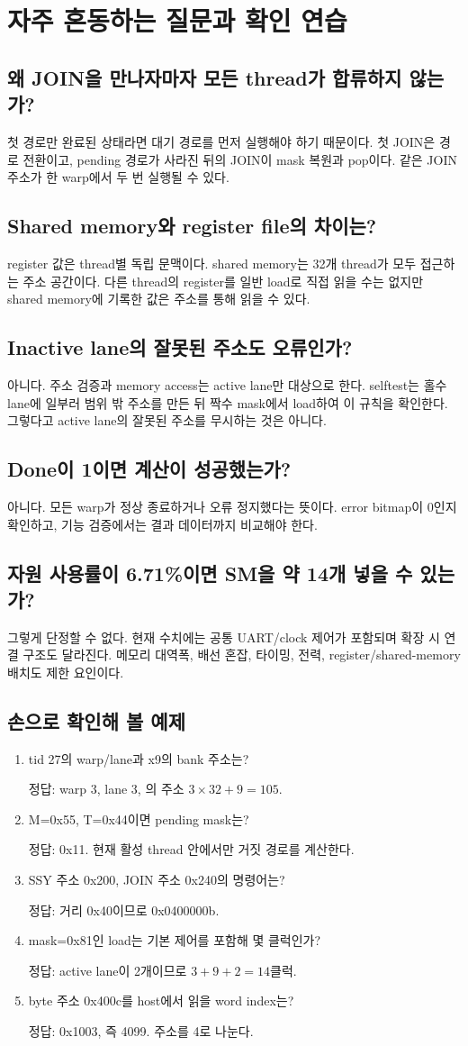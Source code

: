 \documentclass[a4paper,11pt]{article}
\newcommand{\code}[1]{\texttt{\detokenize{#1}}}
\newcommand{\chapterpage}[1]{\clearpage\section{#1}}
\begin{document}
\chapterpage{자주 혼동하는 질문과 확인 연습}
\subsection{왜 JOIN을 만나자마자 모든 thread가 합류하지 않는가?}
첫 경로만 완료된 상태라면 대기 경로를 먼저 실행해야 하기 때문이다. 첫 JOIN은 경로 전환이고, pending 경로가 사라진 뒤의 JOIN이 mask 복원과 pop이다. 같은 JOIN 주소가 한 warp에서 두 번 실행될 수 있다.
\subsection{Shared memory와 register file의 차이는?}
register 값은 thread별 독립 문맥이다. shared memory는 32개 thread가 모두 접근하는 주소 공간이다. 다른 thread의 register를 일반 load로 직접 읽을 수는 없지만 shared memory에 기록한 값은 주소를 통해 읽을 수 있다.
\subsection{Inactive lane의 잘못된 주소도 오류인가?}
아니다. 주소 검증과 memory access는 active lane만 대상으로 한다. selftest는 홀수 lane에 일부러 범위 밖 주소를 만든 뒤 짝수 mask에서 load하여 이 규칙을 확인한다. 그렇다고 active lane의 잘못된 주소를 무시하는 것은 아니다.
\subsection{Done이 1이면 계산이 성공했는가?}
아니다. 모든 warp가 정상 종료하거나 오류 정지했다는 뜻이다. error bitmap이 0인지 확인하고, 기능 검증에서는 결과 데이터까지 비교해야 한다.
\subsection{자원 사용률이 6.71\%이면 SM을 약 14개 넣을 수 있는가?}
그렇게 단정할 수 없다. 현재 수치에는 공통 UART/clock 제어가 포함되며 확장 시 연결 구조도 달라진다. 메모리 대역폭, 배선 혼잡, 타이밍, 전력, register/shared-memory 배치도 제한 요인이다.
\subsection{손으로 확인해 볼 예제}
\begin{enumerate}
\item tid 27의 warp/lane과 x9의 bank 주소는?\par
정답: warp 3, lane 3, \code{lanes[3].rf}의 주소 $3\times32+9=105$.
\item M=0x55, T=0x44이면 pending mask는?\par
정답: 0x11. 현재 활성 thread 안에서만 거짓 경로를 계산한다.
\item SSY 주소 0x200, JOIN 주소 0x240의 명령어는?\par
정답: 거리 0x40이므로 0x0400000b.
\item mask=0x81인 load는 기본 제어를 포함해 몇 클럭인가?\par
정답: active lane이 2개이므로 $3+9+2=14$클럭.
\item byte 주소 0x400c를 host에서 읽을 word index는?\par
정답: 0x1003, 즉 4099. 주소를 4로 나눈다.
\end{enumerate}
\end{document}
